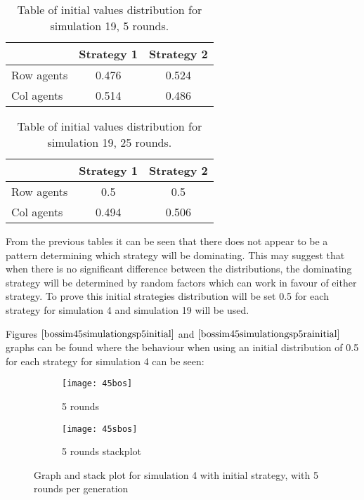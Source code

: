 \begin{table}[H]
\begin{center}
\begin{tabular}{|l|c|c|}
\hline
 & Strategy 1 & Strategy 2\\ 
\hline
Row agents & 0.476 & 0.524 \\
\hline
Col agents & 0.514 & 0.486\\
\hline
\end{tabular}
\caption{ Table of initial values distribution for simulation 19, 5 rounds.}
\label{tab:bossim19r5}	
\end{center}
\end{table}

\begin{table}[H]
\begin{center}
\begin{tabular}{|l|c|c|}
\hline
 & Strategy 1 & Strategy 2\\ 
\hline
Row agents &  0.5 & 0.5\\
\hline
Col agents &  0.494 & 0.506\\
\hline
\end{tabular}
\caption{ Table of initial values distribution for simulation 19, 25 rounds.}
\label{tab:bossim19r25}	
\end{center}
\end{table}

From the previous tables it can be seen that there does not appear to be a pattern determining which strategy will be dominating. This may suggest that when there is no significant difference between the distributions, the dominating strategy will be determined by random factors which can work in favour of either strategy. To prove this initial strategies distribution will be set 0.5 for each strategy for simulation 4 and simulation 19 will be used.

Figures $\ref{bossim45simulationgsp5initial}$ and $\ref{bossim45simulationgsp5rainitial}$ graphs can be found where the behaviour when using an initial distribution of 0.5 for each strategy for simulation 4 can be seen:

\begin{figure}[H]       
    \centering
    \begin{subfigure}[b]{0.3\textwidth}
	\centering
	{\texttt{[image: 45bos]}}   
    	\caption{5 rounds}
	\label{fig:bossim45bos}
    \end{subfigure}
    \hfill
    \begin{subfigure}[b]{0.3\textwidth}
	\centering
	{\texttt{[image: 45sbos]}}   
    	\caption{5 rounds stackplot}
	\label{fig:bossim45sbos}
    \end{subfigure}
    \caption{Graph and stack plot for simulation 4 with initial strategy, with 5 rounds per generation}
    \label{bossim45simulationgsp5initial}
\end{figure}

